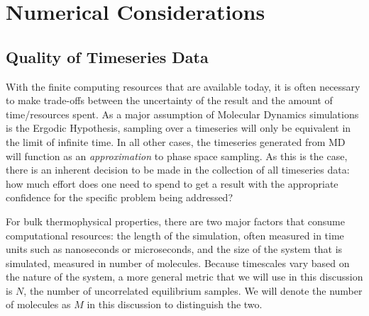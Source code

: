 \documentclass[aps,pre,twocolumn,nofootinbib,superscriptaddress,linenumbers,10pt, draft,tightenlines]{revtex4-1}
\begin{document}
\section{Numerical Considerations}

\subsection{Quality of Timeseries Data}
With the finite computing resources that are available today, it is often necessary to make trade-offs between the uncertainty of the result and the amount of time/resources spent.  As a major assumption of Molecular Dynamics simulations is the Ergodic Hypothesis, sampling over a timeseries will only be equivalent in the limit of infinite time. In all other cases, the timeseries generated from MD will function as an \emph{approximation} to phase space sampling. As this is the case, there is an inherent decision to be made in the collection of all timeseries data: how much effort does one need to spend to get a result with the appropriate confidence for the specific problem being addressed? 

For bulk thermophysical properties, there are two major factors that consume computational resources: the length of the simulation, often measured in time units such as nanoseconds or microseconds, and the size of the system that is simulated, measured in number of molecules.  Because timescales vary based on the nature of the system, a more general metric that we will use in this discussion is $N$, the number of uncorrelated equilibrium samples. We will denote the number of molecules as $M$ in this discussion to distinguish the two.
\end{document}
